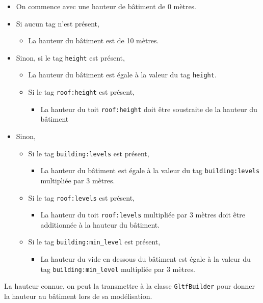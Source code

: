 \begin{itemize}
    \item On commence avec une hauteur de bâtiment de 0 mètres.
    \item Si aucun tag n'est présent,
          \begin{itemize}
              \item La hauteur du bâtiment est de 10 mètres.
          \end{itemize}
    \item Sinon, si le tag \texttt{height} est présent,
          \begin{itemize}
              \item La hauteur du bâtiment est égale à la valeur du tag \texttt{height}.
              \item Si le tag \texttt{roof:height} est présent,
                    \begin{itemize}
                        \item La hauteur du toit \texttt{roof:height} doit être soustraite de la hauteur du bâtiment
                    \end{itemize}
          \end{itemize}
    \item Sinon,
          \begin{itemize}
              \item Si le tag \texttt{building:levels} est présent,
                    \begin{itemize}
                        \item La hauteur du bâtiment est égale à la valeur du tag \texttt{building:levels} multipliée par 3 mètres.
                    \end{itemize}
              \item Si le tag \texttt{roof:levels} est présent,
                    \begin{itemize}
                        \item La hauteur du toit \texttt{roof:levels} multipliée par 3 mètres doit être additionnée à la hauteur du bâtiment.
                    \end{itemize}
              \item Si le tag \texttt{building:min\_level} est présent,
                    \begin{itemize}
                        \item La hauteur du vide en dessous du bâtiment est égale à la valeur du tag \texttt{building:min\_level} multipliée par 3 mètres.
                    \end{itemize}
          \end{itemize}
\end{itemize}

La hauteur connue, on peut la transmettre à la classe \texttt{GltfBuilder} pour donner la hauteur au bâtiment lors de sa modélisation.